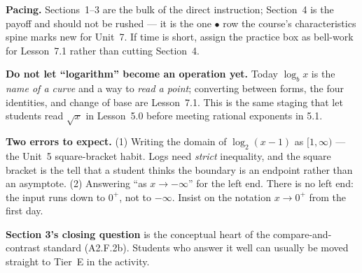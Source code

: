 \documentclass[10pt]{article}
\begin{document}
\begin{teachernote}
\textbf{Pacing.} Sections~1--3 are the bulk of the direct instruction; Section~4 is the payoff and
should not be rushed --- it is the one $\bullet$ row the course's characteristics spine marks new for
Unit~7. If time is short, assign the practice box as bell-work for Lesson~7.1 rather than cutting
Section~4.

\textbf{Do not let ``logarithm'' become an operation yet.} Today $\log_b x$ is the \emph{name of a
curve} and a way to \emph{read a point}; converting between forms, the four identities, and change of
base are Lesson~7.1. This is the same staging that let students read $\sqrt{x}$ in Lesson~5.0 before
meeting rational exponents in 5.1.

\textbf{Two errors to expect.} (1) Writing the domain of $\log_2(x-1)$ as $[1,\infty)$ --- the
Unit~5 square-bracket habit. Logs need \emph{strict} inequality, and the square bracket is the tell
that a student thinks the boundary is an endpoint rather than an asymptote. (2) Answering ``as
$x\to-\infty$'' for the left end. There is no left end: the input runs down to $0^{+}$, not to
$-\infty$. Insist on the notation $x\to 0^{+}$ from the first day.

\textbf{Section 3's closing question} is the conceptual heart of the compare-and-contrast standard
(A2.F.2b). Students who answer it well can usually be moved straight to Tier~E in the activity.
\end{teachernote}
\end{document}
